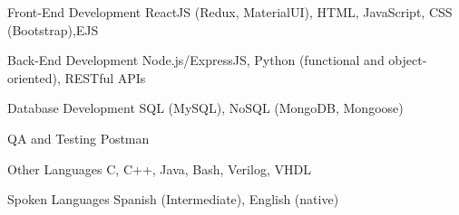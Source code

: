 \newcommand{\Csh}{C{\lserif\#}}



\begin{cvskills}




\cvskill
{Front-End Development} %
{ReactJS (Redux, MaterialUI), HTML, JavaScript, CSS (Bootstrap),EJS} %


\cvskill
{Back-End Development} %
{Node.js/ExpressJS, Python (functional and object-oriented), RESTful APIs} %

\cvskill
{Database Development} %
{SQL (MySQL), NoSQL (MongoDB, Mongoose)} %


\cvskill
{QA and Testing} %
{Postman} %


\cvskill
{Other Languages} %
{C, C++, Java, Bash, Verilog, VHDL} %


\cvskill
{Spoken Languages} %
{Spanish (Intermediate), English (native)} %


\end{cvskills}